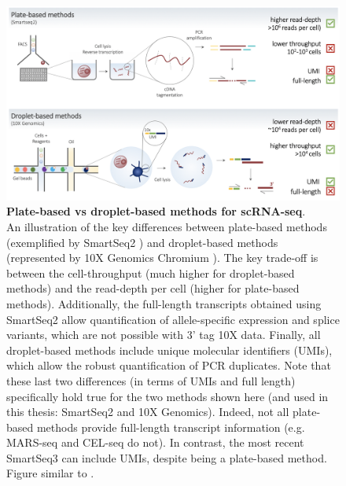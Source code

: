 \begin{figure}[h]
\centering
\includegraphics[width=16cm]{Chapter3/Fig/plate_vs_droplet.png}
\caption[scRNA-seq plate vs droplet]{\textbf{Plate-based vs droplet-based methods for scRNA-seq}.\\
An illustration of the key differences between plate-based methods (exemplified by SmartSeq2 \cite{picelli2013smart}) and droplet-based methods (represented by 10X Genomics Chromium \cite{zheng2017massively}).
The key trade-off is between the cell-throughput (much higher for droplet-based methods) and the read-depth per cell (higher for plate-based methods).
Additionally, the full-length transcripts obtained using SmartSeq2 allow quantification of allele-specific expression and splice variants, which are not possible with 3' tag 10X data.
Finally, all droplet-based methods include unique molecular identifiers (UMIs), which allow the robust quantification of PCR duplicates.
Note that these last two differences (in terms of UMIs and full length) specifically hold true for the two methods shown here (and used in this thesis: SmartSeq2 and 10X Genomics).
Indeed, not all plate-based methods provide full-length transcript information (e.g. MARS-seq \cite{jaitin2014massively} and CEL-seq \cite{hashimshony2012cel} do not).
In contrast, the most recent SmartSeq3 \cite{hagemann2020single} can include UMIs, despite being a plate-based method.
Figure similar to \cite{griffiths2018using}.}
\label{fig:scrnaseq_plate_vs_droplet}
\end{figure}


